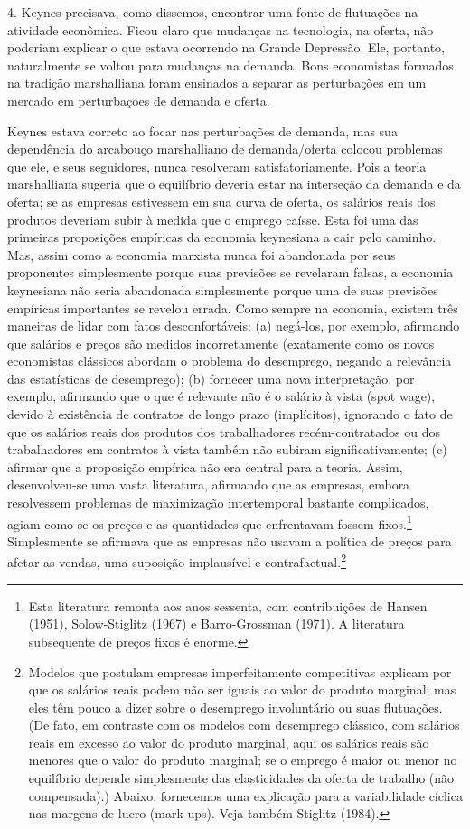 \documentclass[12pt]{article}
\begin{document}
4. Keynes precisava, como dissemos, encontrar uma fonte de flutuações na atividade econômica. Ficou claro que mudanças na tecnologia, na oferta, não poderiam explicar o que estava ocorrendo na Grande Depressão. Ele, portanto, naturalmente se voltou para mudanças na demanda. Bons economistas formados na tradição marshalliana foram ensinados a separar as perturbações em um mercado em perturbações de demanda e oferta.

Keynes estava correto ao focar nas perturbações de demanda, mas sua dependência do arcabouço marshalliano de demanda/oferta colocou problemas que ele, e seus seguidores, nunca resolveram satisfatoriamente. Pois a teoria marshalliana sugeria que o equilíbrio deveria estar na interseção da demanda e da oferta; se as empresas estivessem em sua curva de oferta, os salários reais dos produtos deveriam subir à medida que o emprego caísse. Esta foi uma das primeiras proposições empíricas da economia keynesiana a cair pelo caminho. Mas, assim como a economia marxista nunca foi abandonada por seus proponentes simplesmente porque suas previsões se revelaram falsas, a economia keynesiana não seria abandonada simplesmente porque uma de suas previsões empíricas importantes se revelou errada. Como sempre na economia, existem três maneiras de lidar com fatos desconfortáveis: (a) negá-los, por exemplo, afirmando que salários e preços são medidos incorretamente (exatamente como os novos economistas clássicos abordam o problema do desemprego, negando a relevância das estatísticas de desemprego); (b) fornecer uma nova interpretação, por exemplo, afirmando que o que é relevante não é o salário à vista (spot wage), devido à existência de contratos de longo prazo (implícitos), ignorando o fato de que os salários reais dos produtos dos trabalhadores recém-contratados ou dos trabalhadores em contratos à vista também não subiram significativamente; (c) afirmar que a proposição empírica não era central para a teoria. Assim, desenvolveu-se uma vasta literatura, afirmando que as empresas, embora resolvessem problemas de maximização intertemporal bastante complicados, agiam como se os preços e as quantidades que enfrentavam fossem fixos.\footnote{Esta literatura remonta aos anos sessenta, com contribuições de Hansen (1951), Solow-Stiglitz (1967) e Barro-Grossman (1971). A literatura subsequente de preços fixos é enorme.} Simplesmente se afirmava que as empresas não usavam a política de preços para afetar as vendas, uma suposição implausível e contrafactual.\footnote{Modelos que postulam empresas imperfeitamente competitivas explicam por que os salários reais podem não ser iguais ao valor do produto marginal; mas eles têm pouco a dizer sobre o desemprego involuntário ou suas flutuações. (De fato, em contraste com os modelos com desemprego clássico, com salários reais em excesso ao valor do produto marginal, aqui os salários reais são menores que o valor do produto marginal; se o emprego é maior ou menor no equilíbrio depende simplesmente das elasticidades da oferta de trabalho (não compensada).) Abaixo, fornecemos uma explicação para a variabilidade cíclica nas margens de lucro (mark-ups). Veja também Stiglitz (1984).}
\end{document}
